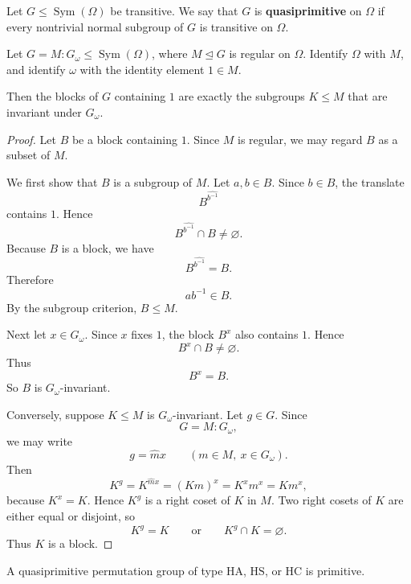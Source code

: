 \begin{definition}
Let \(G\leq \operatorname{Sym}(\Omega)\) be transitive. We say that \(G\) is
\textbf{quasiprimitive} on \(\Omega\) if every nontrivial normal subgroup of \(G\)
is transitive on \(\Omega\).
\end{definition}

\begin{lemma}
Let \(G=M:G_\omega\leq \operatorname{Sym}(\Omega)\), where \(M\unlhd G\) is
regular on \(\Omega\). Identify \(\Omega\) with \(M\), and identify \(\omega\) with
the identity element \(1\in M\).

Then the blocks of \(G\) containing \(1\) are exactly the subgroups
\(K\leq M\) that are invariant under \(G_\omega\).
\end{lemma}

\begin{proof}
Let \(B\) be a block containing \(1\). Since \(M\) is regular, we may regard
\(B\) as a subset of \(M\).

We first show that \(B\) is a subgroup of \(M\). Let \(a,b\in B\). Since
\(b\in B\), the translate
\[
    B^{\widehat{b^{-1}}}
\]
contains \(1\). Hence
\[
    B^{\widehat{b^{-1}}}\cap B\neq\varnothing.
\]
Because \(B\) is a block, we have
\[
    B^{\widehat{b^{-1}}}=B.
\]
Therefore
\[
    ab^{-1}\in B.
\]
By the subgroup criterion, \(B\leq M\).

Next let \(x\in G_\omega\). Since \(x\) fixes \(1\), the block \(B^x\) also contains
\(1\). Hence
\[
    B^x\cap B\neq\varnothing.
\]
Thus
\[
    B^x=B.
\]
So \(B\) is \(G_\omega\)-invariant.

Conversely, suppose \(K\leq M\) is \(G_\omega\)-invariant. Let \(g\in G\). Since
\[
    G=M:G_\omega,
\]
we may write
\[
    g=\widehat m x
    \qquad
    (m\in M,\ x\in G_\omega).
\]
Then
\[
    K^g
    =
    K^{\widehat m x}
    =
    (Km)^x
    =
    K^x m^x
    =
    K m^x,
\]
because \(K^x=K\). Hence \(K^g\) is a right coset of \(K\) in \(M\). Two right
cosets of \(K\) are either equal or disjoint, so
\[
    K^g=K
    \qquad
    \text{or}
    \qquad
    K^g\cap K=\varnothing.
\]
Thus \(K\) is a block.
\end{proof}

\begin{theorem}
A quasiprimitive permutation group of type \(\mathrm{HA}\), \(\mathrm{HS}\), or
\(\mathrm{HC}\) is primitive.
\end{theorem}


